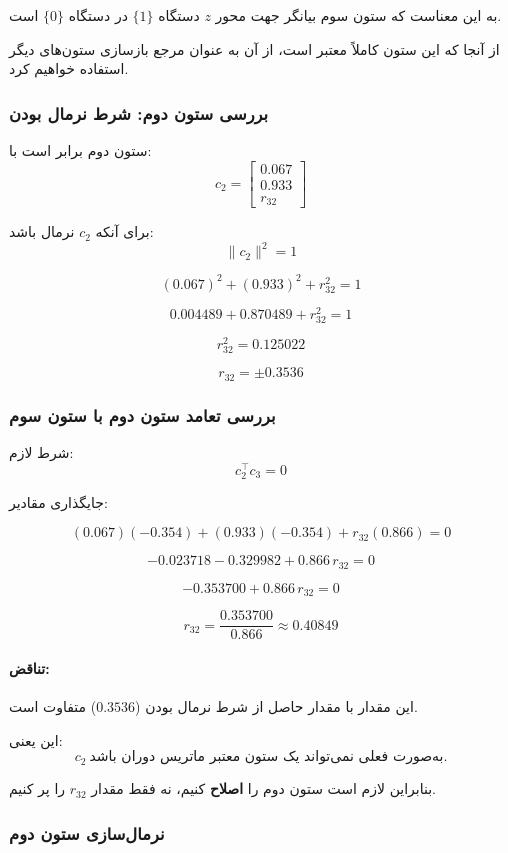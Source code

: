 \documentclass{article}
\begin{document}
به این معناست که ستون سوم بیانگر جهت محور $z$ دستگاه $\{1\}$ در دستگاه $\{0\}$ است.

از آنجا که این ستون کاملاً معتبر است، از آن به عنوان مرجع بازسازی ستون‌های دیگر استفاده خواهیم کرد.

\subsubsection{بررسی ستون دوم: شرط نرمال بودن}

ستون دوم برابر است با:
\[
c_2 = \begin{bmatrix} 0.067 \\ 0.933 \\ r_{32} \end{bmatrix}
\]

برای آنکه $c_2$ نرمال باشد:
\[
\|c_2\|^2 = 1
\]

\[
(0.067)^2 + (0.933)^2 + r_{32}^2 = 1
\]

\[
0.004489 + 0.870489 + r_{32}^2 = 1
\]

\[
r_{32}^2 = 0.125022
\]

\[
r_{32} = \pm 0.3536
\]

\subsubsection{بررسی تعامد ستون دوم با ستون سوم}

شرط لازم:
\[
c_2^\top c_3 = 0
\]

جایگذاری مقادیر:

\[
(0.067)(-0.354) + (0.933)(-0.354) + r_{32}(0.866) = 0
\]

\[
-0.023718 - 0.329982 + 0.866\, r_{32} = 0
\]

\[
-0.353700 + 0.866\, r_{32} = 0
\]

\[
r_{32} = \frac{0.353700}{0.866} \approx 0.40849
\]

\paragraph{تناقض:}  
این مقدار با مقدار حاصل از شرط نرمال بودن ($0.3536$) متفاوت است.

این یعنی:
\[
c_2 \ \textbf{به‌صورت فعلی نمی‌تواند یک ستون معتبر ماتریس دوران باشد.}
\]

بنابراین لازم است ستون دوم را \textbf{اصلاح} کنیم، نه فقط مقدار $r_{32}$ را پر کنیم.

\subsubsection{نرمال‌سازی ستون دوم}
\end{document}
